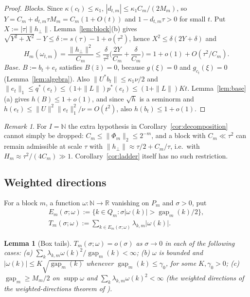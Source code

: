 \documentclass[10pt]{amsart}
\newtheorem{lemma}[theorem]{Lemma}
\theoremstyle{definition}
\theoremstyle{remark}
\newtheorem{remark}[theorem]{Remark}
\newcommand{\supp}{\operatorname{supp}}
\newcommand{\R}{\mathbb R}
\newcommand{\N}{\mathbb N}
\newcommand{\gap}{\operatorname{gap}}
\newcommand{\zh}{\hat z}
\begin{document}
\begin{proof}
\emph{Blocks.}  Since $\kappa(c_t)\le\kappa_1$, $|d_{t,m}|\le
\kappa_1C_m/(2M_m)$, so $Y=C_m+d_{t,m}\tau M_m=C_m(1+O(t))$ and
$1-d_{t,m}\tau>0$ for small $t$.  Put $X:=|\tau|\|h_\perp\|$.
Lemma~\ref{lem:block}(b) gives $\sqrt{Y^2+X^2}-Y\le\delta:=s(\tau)-1+o(\tau^2)$,
hence $X^2\le\delta(2Y+\delta)$ and
\[
 H_m(\omega_{t,m})=\frac{\|h_\perp\|^2}{C_m}\le\frac\delta{\tau^2}
 \Big(\frac{2Y}{C_m}+\frac\delta{C_m}\Big)=1+o(1)+O(\tau^2/C_m).
\]
\emph{Base.}  $B:=b_t+e_t$ satisfies $B(\zh)=0$, because $g(\xi)=0$ and
$g_{c_t}(\xi)=0$ (Lemma~\ref{lem:algebra}).  Also $\|U^*b_t\|\le
\kappa_1\nu/2$ and $\|e_t\|_1\le q^*(e_t)\le(1+\|L\|)p^*(e_t)\le(1+\|L\|)Kt$.
Lemma~\ref{lem:base}(a) gives $h(B)\le1+o(1)$, and since $\sqrt h$ is a
seminorm and $h(e_t)\le\|U\|^2\|e_t\|_1^2/\nu=O(t^2)$, also $h(b_t)\le
1+o(1)$.
\end{proof}

\begin{remark}\label{rem:G2}
For $I=\N$ the extra hypothesis in Corollary~\ref{cor:decomposition} cannot
simply be dropped: $C_m\le\|\Phi_m\|_2\le2^{-m}$, and a block with
$C_m\ll\tau^2$ can remain admissible at scale $\tau$ with
$\|h_\perp\|\approx\tau/2+C_m/\tau$, i.e.\ with $H_m\approx\tau^2/(4C_m)\gg1$.
Corollary~\ref{cor:ladder} itself has no such restriction.
\end{remark}

\subsection{Weighted directions}
For a block $m$, a function $\omega:\N\to\R$ vanishing on $P_m$ and
$\sigma>0$, put
\begin{gather*}
 E_m(\sigma;\omega):=\{k\in Q_m:\sigma|\omega(k)|>\gap_m(k)/2\},\\
 T_m(\sigma;\omega):=\sum_{k\in E_m(\sigma;\omega)}\lambda_{k,m}|\omega(k)|.
\end{gather*}

\begin{lemma}[Box tails]\label{lem:boxtails}
$T_m(\sigma;\omega)=o(\sigma)$ as $\sigma\to0$ in each of the following cases:
\textup{(a)} $\sum_k\lambda_{k,m}\omega(k)^2/\gap_m(k)<\infty$;
\textup{(b)} $\omega$ is bounded and $|\omega(k)|\le K\sqrt{\gap_m(k)}$
whenever $\gap_m(k)\le\gamma_0$, for some $K,\gamma_0>0$;
\textup{(c)} $\gap_m\ge M_m/2$ on $\supp\omega$ and
$\sum_k\lambda_{k,m}\omega(k)^2<\infty$ \textup{(}the weighted directions
of the weighted-directions theorem of \cite{PrA}\textup{)}.
\end{lemma}
\end{document}
